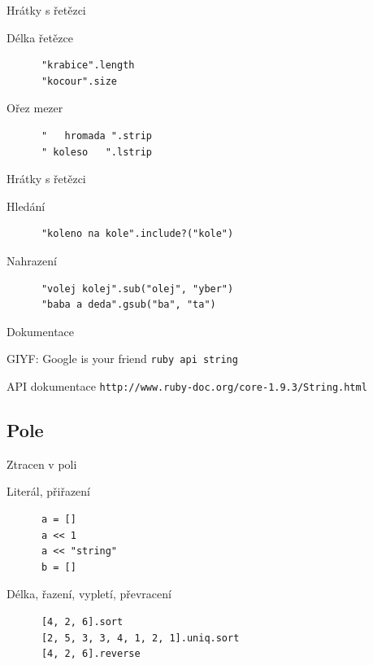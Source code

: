 \documentclass{beamer}
\begin{document}
\begin{frame}[fragile]{Hrátky s řetězci}
  \begin{block}{Délka řetězce}
    \begin{verbatim}
      "krabice".length
      "kocour".size
    \end{verbatim}
  \end{block}
  \pause
  \begin{block}{Ořez mezer}
    \begin{verbatim}
      "   hromada ".strip
      " koleso   ".lstrip
    \end{verbatim}
  \end{block}
\end{frame}

\begin{frame}[fragile]{Hrátky s řetězci}
  \begin{block}{Hledání}
    \begin{verbatim}
      "koleno na kole".include?("kole")
    \end{verbatim}
  \end{block}
  \pause
  \begin{block}{Nahrazení}
    \begin{verbatim}
      "volej kolej".sub("olej", "yber")
      "baba a deda".gsub("ba", "ta")
    \end{verbatim}
  \end{block}
\end{frame}

\begin{frame}{Dokumentace}
  \begin{block}{GIYF: Google is your friend}
    \texttt{ruby api string}
  \end{block}
  \begin{block}{API dokumentace}
    \texttt{http://www.ruby-doc.org/core-1.9.3/String.html}
  \end{block}
\end{frame}

\subsection{Pole}

\begin{frame}[fragile]{Ztracen v poli}
  \begin{block}{Literál, přiřazení}
    \begin{verbatim}
      a = []
      a << 1
      a << "string"
      b = []
    \end{verbatim}
  \end{block}
  \pause
  \begin{block}{Délka, řazení, vypletí, převracení}
    \begin{verbatim}
      [4, 2, 6].sort
      [2, 5, 3, 3, 4, 1, 2, 1].uniq.sort
      [4, 2, 6].reverse
    \end{verbatim}
  \end{block}
\end{frame}
\end{document}
